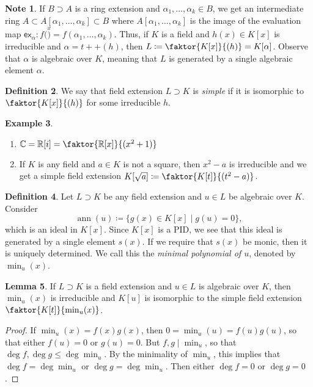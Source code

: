 \documentclass[10pt,letterpaper,cm]{nupset}
\theoremstyle{definition}
\newtheorem{definition}{Definition}[subsection]
\newtheorem{exmp}[definition]{Example}
\newtheorem{note}[definition]{Note}
\theoremstyle{theorem}
\newtheorem{lemma}[definition]{Lemma}
\theoremstyle{remark}
\newcommand{\C}{\mathbb C}
\newcommand{\R}{\mathbb R}
\newcommand{\1}{\mathbf{1}}
\newcommand{\0}{\vec 0}
\DeclareMathOperator{\ann}{ann}
\begin{document}
\begin{note}
If $B \supset A$  is a ring extension and $\alpha_1, \ldots, \alpha_k \in B$, we get an intermediate ring $A \subset A[\alpha_1, \ldots, \alpha_k] \subset B$ where $A[\alpha_1, \ldots, \alpha_k] $ is the image of the evaluation map $\mathsf{ex}_{\alpha} : f(\overset{x}) = f(\alpha_1, \ldots, \alpha_k)$. Thus, if $K$ is a field and $h(x) \in K[x]$ is irreducible and $\alpha = t + +(h)$, then $L\coloneqq \faktor{K[x]}{(h)} = K[\alpha]$. Observe that $\alpha$ is algebraic over $K$, meaning that $L$ is generated by a single algebraic element $\alpha$.
\end{note}

\begin{definition}
We say that field extension $L \supset K$ is \textit{simple} if it is isomorphic to $\faktor{K[x]}{(h)}$ for some irreducible $h$.
\end{definition}

\begin{exmp} $ $
\begin{enumerate}
\item $\C = \R[i] = \faktor{\R[x]}{(x^2 +1)}$
\item If $K$ is any field and $a\in K$ is not a square, then $x^2 -a$ is irreducible and we get a simple field extension $K[\sqrt{a}] \coloneqq \faktor{K[t]}{(t^2 -a)}$.
\end{enumerate}
\end{exmp}

\begin{definition}
Let $L \supset K$ be any field extension and $u\in L$ be algebraic over $K$. Consider $$\ann(u) \coloneqq  \{g(x) \in K[x] \mid g(u) =0\},$$ which is an ideal in $K[x]$. Since $K[x]$ is a PID, we see that this ideal is generated by a single element $s(x)$. If we require that $s(x)$ be monic, then it is uniquely determined. We call this the \textit{minimal polynomial of $u$}, denoted by $\min_u(x)$. 
\end{definition}

\begin{lemma}
If $L \supset K$ is a field extension and $u\in L$ is algebraic over $K$, then $\min_u(x)$ is irreducible and $K[u]$ is isomorphic to the simple field extension $\faktor{K[t]}{\min_u(x)}$.
\end{lemma}
\begin{proof}
If $\min_u(x) = f(x)g(x)$, then $0 = \min_u(u) = f(u) g(u)$, so that either $f(u) = 0$ or $g(u) =0$. But $f,g \mid \min_u$, so that $\deg{f}, \deg{g} \leq \deg{\min_u}$. By the minimality of $\min_u$, this implies that $\deg{f} = \deg{\min_u}$ or $\deg{g} = \deg{\min_u}$. Then either $\deg{f} =0$ or $\deg{g} =0$. 
\end{proof}
\end{document}

